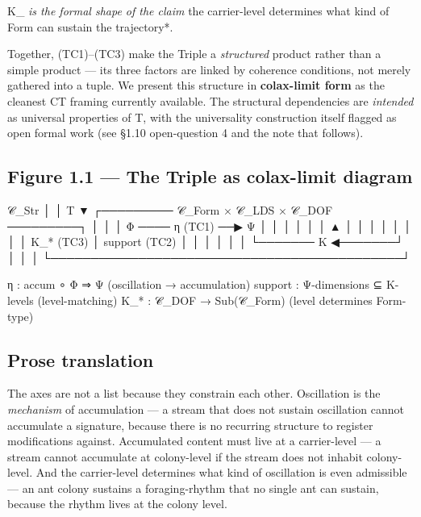 \documentclass[11pt, openany]{book}
\begin{document}
Κ\_\allowbreak{}\textit{ is the formal shape of the claim }the carrier-level determines what kind of Form can sustain the trajectory*.

Together, (TC1)–(TC3) make the Triple a \textit{structured} product rather than a simple product --- its three factors are linked by coherence conditions, not merely gathered into a tuple. We present this structure in \textbf{colax-limit form} as the cleanest CT framing currently available. The structural dependencies are \textit{intended} as universal properties of T, with the universality construction itself flagged as open formal work (see §1.10 open-question 4 and the note that follows).

\subsection{Figure 1.1 --- The Triple as colax-limit diagram}

\begin{Code}
                         𝒞_Str
                          │
                          │ T
                          ▼
       ┌───────── 𝒞_Form × 𝒞_LDS × 𝒞_DOF ─────────┐
       │                                            │
       │    Φ ──── η (TC1) ──▶ Ψ                    │
       │    │                  │                    │
       │    ▲                  │                    │
       │    │                  │                    │
       │    │ Κ_* (TC3)        │ support (TC2)      │
       │    │                  │                    │
       │    └─────── Κ ◀───────┘                    │
       │                                            │
       └────────────────────────────────────────────┘

η  : accum ∘ Φ ⇒ Ψ                    (oscillation → accumulation)
support : Ψ-dimensions ⊆ Κ-levels     (level-matching)
Κ_*  : 𝒞_DOF → Sub(𝒞_Form)             (level determines Form-type)
\end{Code}

\subsection{Prose translation}

The axes are not a list because they constrain each other. Oscillation is the \textit{mechanism} of accumulation --- a stream that does not sustain oscillation cannot accumulate a signature, because there is no recurring structure to register modifications against. Accumulated content must live at a carrier-level --- a stream cannot accumulate at colony-level if the stream does not inhabit colony-level. And the carrier-level determines what kind of oscillation is even admissible --- an ant colony sustains a foraging-rhythm that no single ant can sustain, because the rhythm lives at the colony level.
\end{document}
